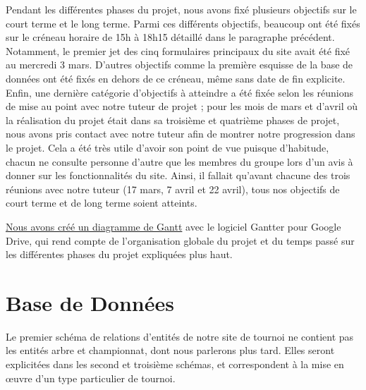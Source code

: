 \documentclass[12pt]{report}
\begin{document}
        \bigskip
        \par
        Pendant les différentes phases du projet, nous avons fixé plusieurs objectifs sur le court terme et le long terme. Parmi ces différents objectifs, beaucoup ont été fixés sur le créneau horaire de 15h à 18h15 détaillé dans le paragraphe précédent. Notamment, le premier jet des cinq formulaires principaux du site avait été fixé au mercredi 3 mars. D’autres objectifs comme la première esquisse de la base de données ont été fixés en dehors de ce créneau, même sans date de fin explicite. Enfin, une dernière catégorie d’objectifs à atteindre a été fixée selon les réunions de mise au point avec notre tuteur de projet ; pour les mois de mars et d’avril où la réalisation du projet était dans sa troisième et quatrième phases de projet, nous avons pris contact avec notre tuteur afin de montrer notre progression dans le projet. Cela a été très utile d’avoir son point de vue puisque d’habitude, chacun ne consulte personne d’autre que les membres du groupe lors d’un avis à donner sur les fonctionnalités du site. Ainsi, il fallait qu’avant chacune des trois réunions avec notre tuteur (17 mars, 7 avril et 22 avril), tous nos objectifs de court terme et de long terme soient atteints.
        
        \bigskip
        \par
	    \hyperlink{annexe-gestion}{Nous avons créé un diagramme de Gantt}
         avec le logiciel Gantter pour Google Drive, qui rend compte de l’organisation globale du projet et du temps passé sur les différentes phases du projet expliquées plus haut.

        \chapter{Base de Données}
        
        \par
        Le premier schéma de relations d'entités de notre site de tournoi ne contient pas les entités arbre et championnat, dont nous parlerons plus tard. Elles seront explicitées dans les second et  troisième schémas, et correspondent à la mise en œuvre d'un type particulier de tournoi. 
        
\end{document}

